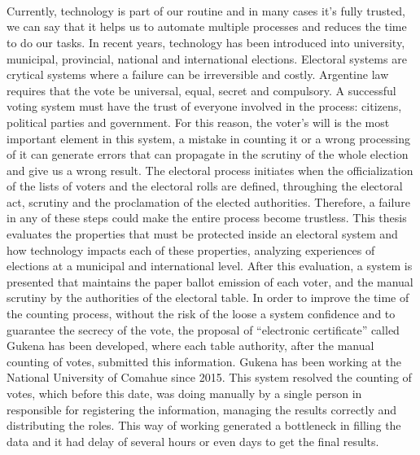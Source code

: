 \ \\
\ \\
\label{pagsumm}
\\
\ \\
\ \\

\ \\

\ \\
\ \\

Currently, technology is part of our routine and in many cases it's fully trusted, we can say that it helps us to automate multiple processes and reduces the time to do our tasks. In recent years, technology has been introduced into university, municipal, provincial, national and international elections. Electoral systems are crytical systems where a failure can be irreversible and costly. Argentine law requires that the vote be universal, equal, secret and compulsory. A successful voting system must have the trust of everyone involved in the process: citizens, political parties and government. For this reason, the voter's will is the most important element in this system, a mistake in counting it or a wrong processing of it can generate errors that can propagate in the scrutiny of the whole election and give us a wrong result.\newline
The electoral process initiates when the officialization of the lists of voters and the electoral rolls are defined, throughing the electoral act, scrutiny and the proclamation of the elected authorities. Therefore, a failure in any of these steps could make the entire process become trustless.\newline
This thesis evaluates the properties that must be protected inside an electoral system and how technology impacts each of these properties, analyzing experiences of elections at a municipal and international level. After this evaluation, a system is presented that maintains the paper ballot emission of each voter, and the manual scrutiny by the authorities of the electoral table. In order to improve the time of the counting process, without the risk of the loose a system confidence and to guarantee the secrecy of the vote, the proposal of ``electronic certificate'' called Gukena has been developed, where each table authority, after the manual counting of votes, submitted this information.\newline
Gukena has been working at the National University of Comahue since 2015. This system resolved the counting of votes, which before this date, was doing manually by a single person in responsible for registering the information, managing the results correctly and distributing the roles. This way of working generated a bottleneck in filling the data and it had delay of several hours or even days to get the final results.\newline
